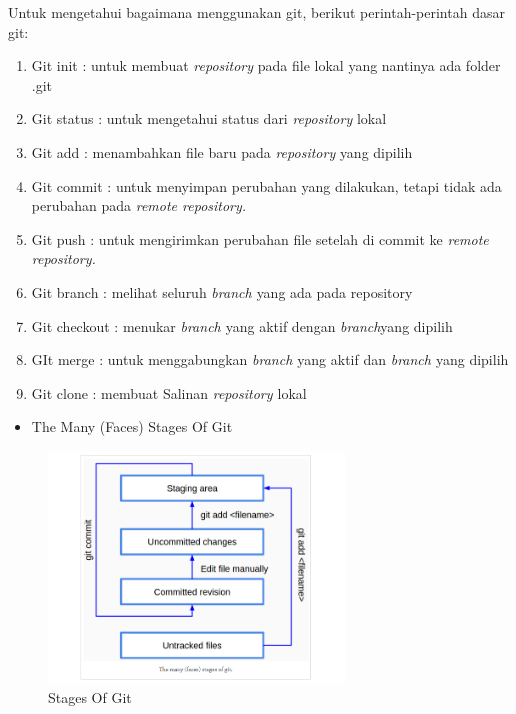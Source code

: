 \noindent 
Untuk mengetahui bagaimana menggunakan git, berikut perintah-perintah dasar git: \par
\noindent 
\begin{enumerate}
\item Git init : untuk membuat $  $\textit{repository} $  $pada file lokal yang nantinya ada folder .git \par
\noindent 
\item Git status : untuk mengetahui status dari $  $\textit{repository} $  $lokal \par
\noindent 
\item Git add : menambahkan file baru pada $  $\textit{repository} $  $yang dipilih \par
\noindent 
\item Git commit : untuk menyimpan perubahan yang dilakukan, tetapi tidak ada perubahan pada $  $\textit{remote repository.} \par
\noindent 
\item Git push : untuk mengirimkan perubahan file setelah di commit ke $  $\textit{remote repository.} \par
\noindent 
\item Git branch : melihat seluruh $  $\textit{branch $  $}yang ada pada repository \par
\noindent 
\item Git checkout : menukar $  $\textit{branch $  $}yang aktif dengan $  $\textit{branch}yang dipilih \par
\noindent 
\item GIt merge : untuk menggabungkan $  $\textit{branch $  $}yang aktif dan $  $\textit{branch $  $}yang dipilih \par
\noindent 
\item Git clone : membuat Salinan $  $\textit{repository $  $}lokal\end{enumerate}
 \par
 
  \begin{itemize}
 	\item The Many (Faces) Stages Of Git
 \end{itemize}
 
  \begin{figure}[ht]
 	\centerline{\includegraphics[width=0.70\textwidth]{figures/GitReview}}
 	\caption{Stages Of Git}
 	\label{Satges Of Git}
 \end{figure}
 
